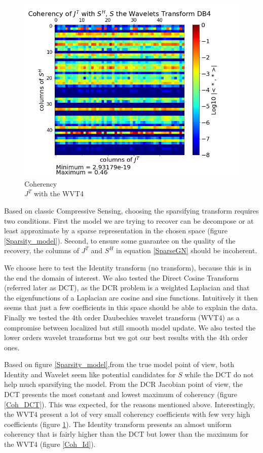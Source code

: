 \documentclass[twoside]{article}
\begin{document}
\begin{figure}[!ht]
\begin{minipage}{.31\textwidth}
\end{minipage}
\begin{minipage}{.31\textwidth}
  \centering
  \includegraphics[width=.99\linewidth]{figures/Coherency_WaveletDB4.png}
  \caption{Coherency \\$J^T$ with the WVT4}
  \label{Coh_DB4}
\end{minipage}
\end{figure}

Based on classic Compressive Sensing, choosing the sparsifying transform requires two conditions. First the model we are trying to recover can be decompose or at least approximate by a sparse representation in the chosen space (figure \ref{Sparsity_model}). Second, to ensure some guarantee on the quality of the recovery, the columns of $J^T$ and $S^H$ in equation \ref{SparseGN} should be incoherent.

We choose here to test the Identity transform (no transform), because this is in the end the domain of interest. We also tested the Direct Cosine Transform (referred later as DCT), as the DCR problem is a weighted Laplacian and that the eigenfunctions of a Laplacian are cosine and sine functions. Intuitively it then seems that just a few coefficients in this space should be able to explain the data. Finally we tested the 4th order Daubechies wavelet transform (WVT4) as a compromise between localized but still smooth model update. We also tested the lower orders wavelet transforms but we got our best results with the 4th order ones.

Based on figure \ref{Sparsity_model},from the true model point of view, both Identity and Wavelet seem like potential candidates for $S$ while the DCT do not help much sparsifying the model. 
From the DCR Jacobian point of view, the DCT presents the most constant and lowest maximum of coherency (figure \ref{Coh_DCT}). This was expected, for the reasons mentioned above. Interestingly, the WVT4 present a lot of very small coherency coefficients with few very high coefficients (figure \ref{Coh_DB4}). The Identity transform presents an almost uniform coherency that is fairly higher than the DCT but lower than the maximum for the WVT4 (figure \ref{Coh_Id}).
\end{document}
